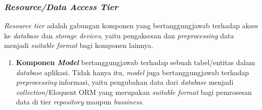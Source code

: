 	\subsubsection{\textit{Resource/Data Access Tier}}
	\textit{Resource tier} adalah gabungan komponen yang bertanggungjawab terhadap akses ke \textit{database} dan \textit{storage devices}, yaitu pengaksesan dan \textit{preprocessing} data menjadi \textit{suitable format} bagi komponen lainnya.
	\begin{enumerate}
		\item \textbf{Komponen \textit{Model}} bertanggungjawab terhadap sebuah tabel/entitas dalam \textit{database} aplikasi. Tidak hanya itu, \textit{model} juga bertanggungjawab terhadap \textit{preprocessing} informasi, yaitu pengubahan data dari \textit{database} menjadi \textit{collection}/Eloquent ORM yang merupakan \textit{suitable format} bagi pemrosesan data di tier \textit{repository} maupun \textit{bussiness}.
	\end{enumerate}		
		
	\newpage
	

	
	
	